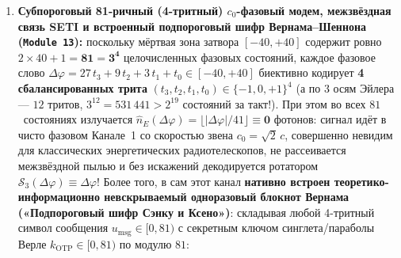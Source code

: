 \begin{enumerate}[label=\textbf{\arabic*.},leftmargin=*]
\begin{itemize}[noitemsep]
    если между станциями стоит цепочка промежуточных хабов-ретрансляторов $R_1, R_2, \dots, R_k$, связанных попарными противофазными синглетами $(a, r_{1,\mathrm{in}})$, $(r_{1,\mathrm{out}}, r_{2,\mathrm{in}})$, $\dots$, $(r_{k,\mathrm{out}}, b)$, то каждый транзитный хаб $R_m$ применяет к своим двум половинкам \textbf{ровно тот же самый оператор синдрома с противофазным сдвигом $-256$}:
    \[
      \sigma_{R_m} \;:=\; \bigl(r_{m,\mathrm{in}} - r_{m,\mathrm{out}} - 256\bigr)\bmod 512.
    \]
    Тогда на конечной станции~$B$ сумма всех синдромов вдоль маршрута даёт:
    \[
      \psi_B \;=\; \bigl(b + \sigma_{R_k} + \dots + \sigma_{R_1} + \sigma_A\bigr)\bmod 512 \;\equiv\; \mathbf{\psi_{\mathrm{src}}},
    \]
    причём все неизвестные промежуточные фазы $a, r_1, \dots, r_k$ и все полупериоды $+256$ сокращаются в точный ноль без единого измерения!
  \item \emph{Секрет~3 (Бескоординатная адресация станций сети по взаимно простым ключам Безу на $\mathbb{Z}_{512}^\times$):}
    каждой станции сети назначается один из обратимых ключей носителя $(k_j, k_j^{-1})\in\{(41,25),\,(13,197),\,(97,417),\,(263,183)\}$. Станция~$j$ переключает свой экран из стазиса ($D_{\mathrm{stasis}} = 833\,\varepsilon$) в приёмное окно записи ($D_{\mathrm{write}} = \varepsilon$) тогда и только тогда, когда произведение заголовка пакета на её обратный ключ даёт единицу носителя: $(k_j^{-1}\cdot k_{\mathrm{pkt}})\bmod 512 = \mathbf{1 = d^2 - 2^d}$!
  \end{itemize}
  \item \textbf{Субпороговый 81-ричный (4-тритный) $c_0$-фазовый модем, межзвёздная связь SETI и встроенный подпороговый шифр Вернама--Шеннона (\texttt{Module~13}):}
  поскольку мёртвая зона затвора $[-40,+40]$ содержит ровно $2\times 40 + 1 = \mathbf{81 = 3^4}$ целочисленных фазовых состояний, каждое фазовое слово $\Delta\varphi = 27\,t_3 + 9\,t_2 + 3\,t_1 + t_0\in[-40,+40]$ биективно кодирует \textbf{4 сбалансированных трита} $(t_3,t_2,t_1,t_0)\in\{-1,0,+1\}^4$ (а по 3 осям Эйлера --- $12$ тритов, $3^{12} = 531\,441 > 2^{19}$ состояний за такт!). При этом во всех $81$~состояниях излучается $\hat{n}_E(\Delta\varphi) = \lfloor|\Delta\varphi|/41\rfloor \equiv \mathbf{0\text{ фотонов}}$: сигнал идёт в чисто фазовом Канале~1 со скоростью звена $c_0 = \sqrt{2}\,c$, совершенно невидим для классических энергетических радиотелескопов, не рассеивается межзвёздной пылью и без искажений декодируется ротатором $\mathcal{S}_3(\Delta\varphi)\equiv\Delta\varphi$!
  Более того, в сам этот канал \textbf{нативно встроен теоретико-информационно невскрываемый одноразовый блокнот Вернама («Подпороговый шифр Сэнку и Ксено»)}: складывая любой 4-тритный символ сообщения $u_{\mathrm{msg}}\in[0,81)$ с секретным ключом синглета/параболы Верле $k_{\mathrm{OTP}}\in[0,81)$ по модулю $81$:

\end{enumerate}
